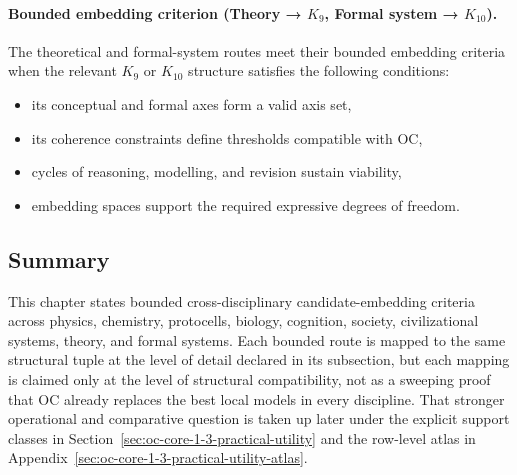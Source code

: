 \paragraph{Bounded embedding criterion (Theory → \texorpdfstring{\(K_9\)}{K9}, Formal system → \texorpdfstring{\(K_{10}\)}{K10}).}
The theoretical and formal-system routes meet their bounded embedding
criteria when the relevant \(K_9\) or \(K_{10}\) structure satisfies the following
conditions:
\begin{itemize}
  \item its conceptual and formal axes form a valid axis set,
  \item its coherence constraints define thresholds compatible with OC,
  \item cycles of reasoning, modelling, and revision sustain viability,
  \item embedding spaces support the required expressive degrees of freedom.
\end{itemize}

\subsection*{Summary}

This chapter states bounded cross-disciplinary candidate-embedding criteria across
physics, chemistry, protocells, biology, cognition, society, civilizational systems,
theory, and formal systems. Each bounded route is mapped to the same structural tuple at the level of detail declared in its subsection, but each mapping is
claimed only at the level of structural compatibility, not as a sweeping proof
that OC already replaces the best local models in every discipline. That
stronger operational and comparative question is taken up later under the
explicit support classes in Section~\ref{sec:oc-core-1-3-practical-utility}
and the row-level atlas in
Appendix~\ref{sec:oc-core-1-3-practical-utility-atlas}.

